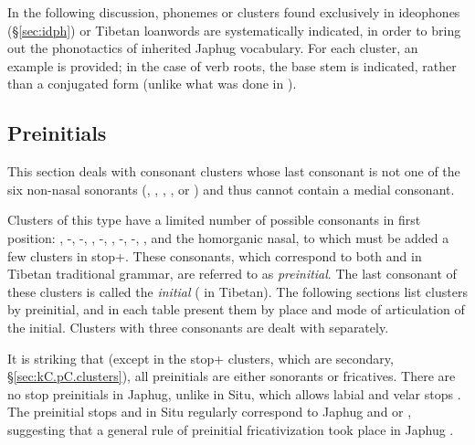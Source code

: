 In the following discussion, phonemes or clusters found exclusively in ideophones (§\ref{sec:idph}) or Tibetan loanwords are systematically indicated, in order to bring out the phonotactics of inherited Japhug vocabulary. For each cluster, an example is provided; in the case of verb roots, the base stem is indicated, rather than a conjugated form (unlike what was done in  \citealt{jacques19ipa}).



\subsection{Preinitials} \label{sec:preinitials}
This section deals with consonant clusters whose last consonant is not one of the six non-nasal sonorants (, , , ,  or ) and thus cannot contain a medial consonant. 

Clusters of this type have a limited number of possible consonants in first position: , -, -, , -, , -, -, ,  and the homorganic nasal, to which must be added a few clusters in stop+. These consonants, which correspond to both  and  in Tibetan traditional grammar, are referred to as \textit{preinitial}. The last consonant of these clusters is called the \textit{initial} ( in Tibetan). The following sections list clusters by preinitial, and in each table present them by place and mode of articulation of the initial. Clusters with three consonants are dealt with separately.

It is striking that (except in the stop+ clusters, which are secondary, §\ref{sec:kC.pC.clusters}), all preinitials are either sonorants or fricatives. There are no stop preinitials in Japhug, unlike in Situ, which allows labial and velar stops \citep[44]{zhang16bragdbar}. The preinitial stops   and  in Situ regularly correspond to Japhug  and  or , suggesting that a general rule of preinitial fricativization took place in Japhug \citep[273]{jacques04these}.


